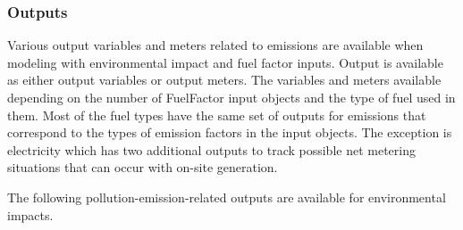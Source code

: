 \subsubsection{Outputs}\label{outputs-029}

Various output variables and meters related to emissions are available when modeling with environmental impact and fuel factor inputs. Output is available as either output variables or output meters. The variables and meters available depending on the number of FuelFactor input objects and the type of fuel used in them. Most of the fuel types have the same set of outputs for emissions that correspond to the types of emission factors in the input objects. The exception is electricity which has two additional outputs to track possible net metering situations that can occur with on-site generation.

The following pollution-emission-related outputs are available for environmental impacts.

